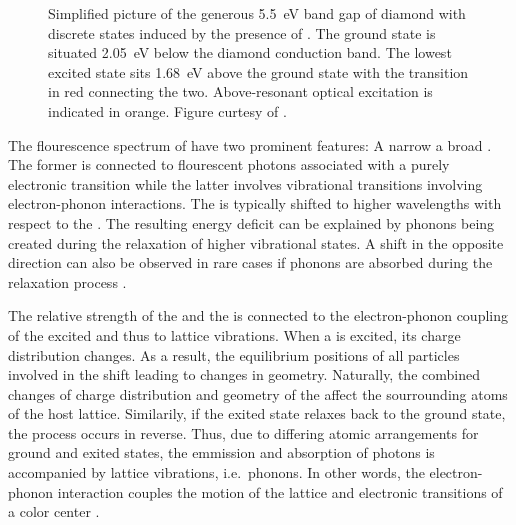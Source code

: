     \begin{figure}[htbp]
      \centering
      \caption[Band gap of \sivs hosted in diamond]{Simplified picture of the generous \SI{5.5}{\eV} band gap of diamond with discrete states induced by the presence of \sivs. The \siv ground state is situated \SI{2.05}{\eV} below the diamond conduction band. The lowest excited state sits \SI{1.68}{\eV} above the ground state with the \zpl transition in red connecting the two. Above-resonant optical excitation is indicated in orange. Figure curtesy of \cite{becker::thesis}.}
      \label{fig::above_resonant_excitation}
    \end{figure}

    The flourescence spectrum of \sivs have two prominent features: A narrow \zpl a broad \psb. The former is connected to flourescent photons associated with a purely electronic transition while the latter involves vibrational transitions involving electron-phonon interactions. The \psb is typically shifted to higher wavelengths with respect to the \zpl. The resulting energy deficit can be explained by phonons being created during the relaxation of higher vibrational states. A shift in the opposite direction can also be observed in rare cases if phonons are absorbed during the relaxation process \cite{becker::36}.

    The relative strength of the \zpl and the \psb is connected to the electron-phonon coupling of the excited \cc and thus to lattice vibrations. When a \cc is excited, its charge distribution changes. As a result, the equilibrium positions of all particles involved in the \cc shift leading to changes in \cc geometry. Naturally, the combined changes of charge distribution and geometry of the \cc affect the sourrounding atoms of the host lattice. Similarily, if the exited state relaxes back to the ground state, the process occurs in reverse. Thus, due to differing atomic arrangements for ground and exited states, the emmission and absorption of photons is accompanied by lattice vibrations, i.e.\ phonons. In other words, the electron-phonon interaction couples the motion of the lattice and electronic transitions of a color center \cite{Davies1981, Zaitsev2000}.

